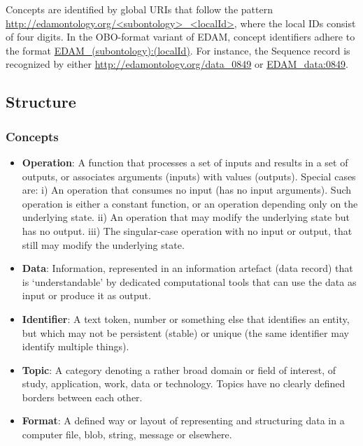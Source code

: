 \documentclass{scrartcl}
\begin{document}
Concepts are identified by global URIs that follow the pattern 
  \url{http://edamontology.org/<subontology>\_<localId>}, where the local IDs
  consist of four digits. In the OBO-format variant of EDAM, concept 
  identifiers adhere to the format \url{EDAM\_(subontology):(localId)}. 
  For instance, the Sequence record is recognized by either 
  \url{http://edamontology.org/data\_0849} or \url{EDAM\_data:0849}.

\subsection{Structure}

\subsubsection{Concepts}
\begin{itemize}
  \item \textbf{Operation}: A function that processes a set of inputs and results in a set 
    of outputs, or associates arguments (inputs) with values (outputs). 
    Special cases are: 
      i) An operation that consumes no input (has no input arguments). Such operation is either 
      a constant function, or an operation depending only on the underlying state. 
      ii) An operation that may modify the underlying state but has no output. 
      iii) The singular-case operation with no input or output, that still may modify the underlying state.

  \item \textbf{Data}: Information, represented in an information artefact (data record) 
    that is ‘understandable’ by dedicated computational tools that can use 
    the data as input or produce it as output.

  \item \textbf{Identifier}: A text token, number or something else that identifies an entity, 
    but which may not be persistent (stable) or unique (the same identifier may identify multiple
    things).
  
  \item \textbf{Topic}: A category denoting a rather broad domain or field of interest, of study, 
    application, work, data or technology. Topics have no clearly defined borders between each other.
  
  \item \textbf{Format}: A defined way or layout of representing and structuring data in a computer file, 
    blob, string, message or elsewhere.
  
\end{itemize}
\end{document}
